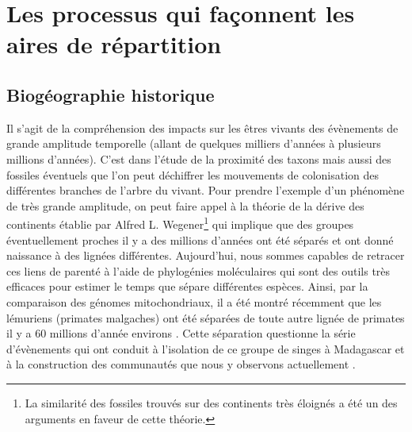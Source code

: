 \section*{Les processus qui façonnent les aires de
répartition}\label{les-processus-qui-fauxe7onnent-les-aires-de-ruxe9partition}

\subsection*{Biogéographie
historique}\label{bioguxe9ographie-historique}

Il s'agit de la compréhension des impacts sur les êtres vivants des
évènements de grande amplitude temporelle (allant de quelques milliers
d'années à plusieurs millions d'années). C'est dans l'étude de la
proximité des taxons mais aussi des fossiles éventuels que l'on peut
déchiffrer les mouvements de colonisation des différentes branches de
l'arbre du vivant. Pour prendre l'exemple d'un phénomène de très grande
amplitude, on peut faire appel à la théorie de la dérive des continents
établie par Alfred L. Wegener\footnote{La similarité des fossiles
  trouvés sur des continents très éloignés a été un des arguments en
  faveur de cette théorie.} qui implique que des groupes éventuellement
proches il y a des millions d'années ont été séparés et ont donné
naissance à des lignées différentes. Aujourd'hui, nous sommes capables
de retracer ces liens de parenté à l'aide de phylogénies moléculaires
qui sont des outils très efficaces pour estimer le temps que sépare
différentes espèces. Ainsi, par la comparaison des génomes
mitochondriaux, il a été montré récemment que les lémuriens (primates
malgaches) ont été séparées de toute autre lignée de primates il y a 60
millions d'année environs \citep{Finstermeier2013}. Cette séparation
questionne la série d'évènements qui ont conduit à l'isolation de ce
groupe de singes à Madagascar et à la construction des communautés que
nous y observons actuellement \citep{Razafindratsima2013}.


